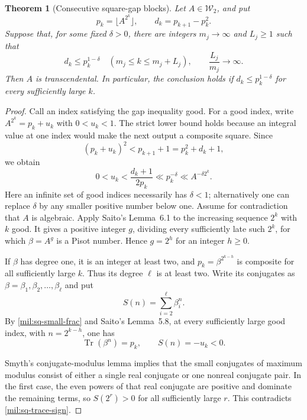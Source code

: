 \documentclass[11pt,a4paper]{article}
\newtheorem{theorem}{Theorem}[section]
\theoremstyle{definition}
\theoremstyle{remark}
\numberwithin{equation}{section}
\begin{document}
\begin{theorem}[Consecutive square-gap blocks]\label{mil:sq-block}
Let $A\in\mathcal W_2$, and put
\[
 p_k=\lfloor A^{2^k}\rfloor,\qquad d_k=p_{k+1}-p_k^2.
\]
Suppose that, for some fixed $\delta>0$, there are integers
$m_j\to\infty$ and $L_j\ge1$ such that
\begin{equation}\label{mil:sq-good-block}
 d_k\le p_k^{1-\delta}
 \quad(m_j\le k\le m_j+L_j),
 \qquad \frac{L_j}{m_j}\longrightarrow\infty.
\end{equation}
Then $A$ is transcendental. In particular, the conclusion holds
if $d_k\le p_k^{1-\delta}$ for every sufficiently large $k$.
\end{theorem}
\begin{proof}
Call an index satisfying the gap inequality good. For a good index,
write $A^{2^k}=p_k+u_k$ with $0<u_k<1$. The strict lower bound
holds because an integral value at one index would make the next
output a composite square. Since
\[
 (p_k+u_k)^2<p_{k+1}+1=p_k^2+d_k+1,
\]
we obtain
\begin{equation}\label{mil:sq-small-frac}
 0<u_k<\frac{d_k+1}{2p_k}\ll p_k^{-\delta}
 \ll A^{-\delta 2^k}.
\end{equation}
Here an infinite set of good indices necessarily has $\delta<1$;
alternatively one can replace $\delta$ by any smaller positive
number below one. Assume for contradiction that $A$ is algebraic.
Apply Saito's Lemma~6.1 to the increasing sequence $2^k$ with $k$
good. It gives a positive integer $g$, dividing every sufficiently
late such $2^k$, for which $\beta=A^g$ is a Pisot number. Hence
$g=2^h$ for an integer $h\ge0$.

If $\beta$ has degree one, it is an integer at least two, and
$p_k=\beta^{2^{k-h}}$ is composite for all sufficiently large $k$.
Thus its degree $\ell$ is at least two. Write its conjugates as
$\beta=\beta_1,\beta_2,\ldots,\beta_\ell$ and put
\[
 S(n)=\sum_{i=2}^{\ell}\beta_i^n.
\]
By \eqref{mil:sq-small-frac} and Saito's Lemma~5.8, at every sufficiently
large good index, with $n=2^{k-h}$, one has
\begin{equation}\label{mil:sq-trace-sign}
 \operatorname{Tr}(\beta^n)=p_k,
 \qquad S(n)=-u_k<0.
\end{equation}

Smyth's conjugate-modulus lemma implies that the small conjugates
of maximum modulus consist of either a single real conjugate or
one nonreal conjugate pair. In the first case, the even powers of
that real conjugate are positive and dominate the remaining
terms, so $S(2^r)>0$ for all sufficiently large $r$. This contradicts
\eqref{mil:sq-trace-sign}.


\end{proof}
\end{document}
